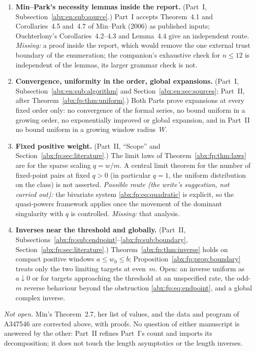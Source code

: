 \documentclass[11pt,letterpaper]{article}
\numberwithin{equation}{section}
\theoremstyle{remark}\newtheorem{remark}[theorem]{Remark}
\begin{document}
\begin{enumerate}[label=\textbf{\arabic*.},ref=\arabic*,leftmargin=*]
\item\label{abx:q:minpark} \textbf{Min--Park's necessity lemmas inside the report.} (Part~I, Subsection~\ref{abx:en:sub:source}.) Part~I accepts Theorem~4.1 and Corollaries~4.5 and~4.7 of Min--Park (2006) as published inputs; Ouchterlony's Corollaries~4.2--4.3 and Lemma~4.4 give an independent route. \emph{Missing:} a proof inside the report, which would remove the one external trust boundary of the enumeration; the companion's exhaustive check for $n\le12$ is independent of the lemmas, its larger grammar check is not.
\item\label{abx:q:exponential} \textbf{Convergence, uniformity in the order, global expansions.} (Part~I, Subsection~\ref{abx:en:sub:algorithm} and Section~\ref{abx:en:sec:sources}; Part~II, after Theorem~\ref{abx:fp:thm:uniform}.) Both Parts prove expansions at every fixed order only: no convergence of the formal series, no bound uniform in a growing order, no exponentially improved or global expansion, and in Part~II no bound uniform in a growing window radius~$W$.
\item\label{abx:q:clt} \textbf{Fixed positive weight.} (Part~II, ``Scope'' and Section~\ref{abx:fp:sec:literature}.) The limit laws of Theorem~\ref{abx:fp:thm:laws} are for the sparse scaling $q=w/m$. A central limit theorem for the number of fixed-point pairs at fixed $q>0$ (in particular $q=1$, the uniform distribution on the class) is not asserted. \emph{Possible route (the write's suggestion, not carried out):} the bivariate system \eqref{abx:fp:eq:quadratic} is explicit, so the quasi-powers framework applies once the movement of the dominant singularity with $q$ is controlled. \emph{Missing:} that analysis.
\item\label{abx:q:boundary} \textbf{Inverses near the threshold and globally.} (Part~II, Subsections~\ref{abx:fp:sub:endpoint}--\ref{abx:fp:sub:boundary}, Section~\ref{abx:fp:sec:literature}.) Theorem~\ref{abx:fp:thm:inverse} holds on compact positive windows $a\le w_0\le b$; Proposition~\ref{abx:fp:prop:boundary} treats only the two limiting targets at even~$m$. Open: an inverse uniform as $a\downarrow0$ or for targets approaching the threshold at an unspecified rate, the odd-$m$ reverse behaviour beyond the obstruction \eqref{abx:fp:eq:endpoint}, and a global complex inverse.
\end{enumerate}

\emph{Not open.} Min's Theorem~2.7, her list of values, and the data and program of A347546 are corrected above, with proofs. No question of either manuscript is answered by the other: Part~II refines Part~I's count and imports its decomposition; it does not touch the length asymptotics or the length inverses.
\end{document}
